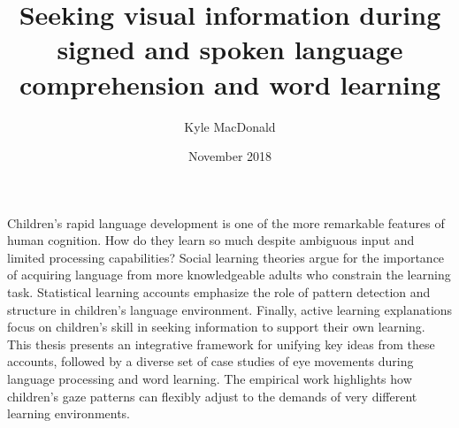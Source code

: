 \documentclass[oneside]{report}
\begin{document}
\title{Seeking visual information during signed and spoken language
comprehension and word learning}
\author{Kyle MacDonald}
\date{November 2018}


\makeatletter
\def\maxwidth{ %
  \ifdim\Gin@nat@width>\linewidth
    \linewidth
  \else
    \Gin@nat@width
  \fi
}
\makeatother

\renewcommand{\contentsname}{Contents}

\setlength{\parskip}{0pt}


\providecommand{\tightlist}{%
  \setlength{\itemsep}{0pt}\setlength{\parskip}{0pt}}




\beforepreface
{}
Children's rapid language development is one of the more remarkable
features of human cognition. How do they learn so much despite ambiguous
input and limited processing capabilities? Social learning theories
argue for the importance of acquiring language from more knowledgeable
adults who constrain the learning task. Statistical learning accounts
emphasize the role of pattern detection and structure in children's
language environment. Finally, active learning explanations focus on
children's skill in seeking information to support their own learning.
This thesis presents an integrative framework for unifying key ideas
from these accounts, followed by a diverse set of case studies of eye
movements during language processing and word learning. The empirical
work highlights how children's gaze patterns can flexibly adjust to the
demands of very different learning environments.
\end{document}
